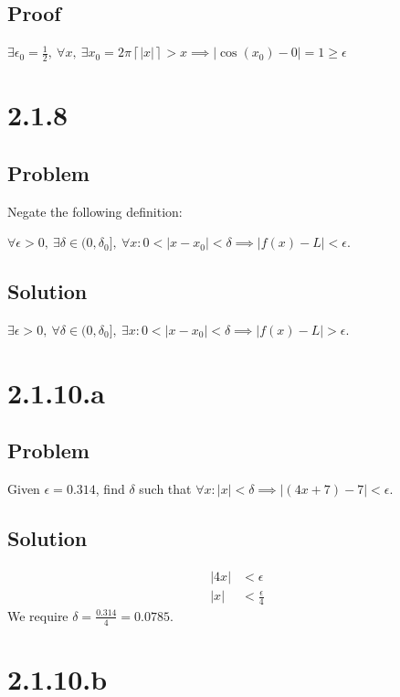 \documentclass[12pt]{article}
\newcommand{\abs}  [1]{\left|       #1 \right|      }
\newcommand{\ceil} [1]{\left\lceil  #1 \right\rceil }
\begin{document}
\subsection*{Proof}
$\exists \epsilon_0 = \frac{1}{2},\ \forall x,\ \exists x_0 = 2 \pi \ceil{\abs{x}} > x \implies \abs{\cos(x_0) - 0} = 1 \geq \epsilon$



\section*{2.1.8}

\subsection*{Problem}

Negate the following definition:

$\forall \epsilon > 0,\ \exists \delta \in (0, \delta_0],\ \forall x : 0 < \abs{x - x_0} < \delta \implies \abs{f(x) - L} < \epsilon$.

\subsection*{Solution}
$\exists \epsilon > 0,\ \forall \delta \in (0, \delta_0],\ \exists x : 0 < \abs{x - x_0} < \delta \implies \abs{f(x) - L} > \epsilon$.



\section*{2.1.10.a}

\subsection*{Problem}
Given $\epsilon = 0.314$, find $\delta$ such that $\forall x : \abs{x} < \delta \implies \abs{(4x + 7) - 7} < \epsilon$.

\subsection*{Solution}
\begin{align*}
    \abs{4x} &< \epsilon \\
    \abs{x} &< \frac{\epsilon}{4}
\end{align*}
We require $\delta = \frac{0.314}{4} = \boxed{0.0785}$.



\section*{2.1.10.b}
\end{document}
